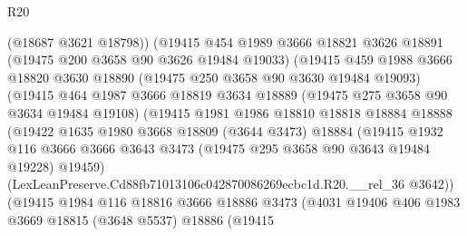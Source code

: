 \begin{lexlean}{R20}
\begin{coremodule}
                        (@18687 @3621 @18798))
                      (@19415
                        @454
                        @1989
                        @3666
                        @18821
                        @3626
                        @18891
                        (@19475 @200 @3658 @90 @3626 @19484 @19033)
                        (@19415
                          @459
                          @1988
                          @3666
                          @18820
                          @3630
                          @18890
                          (@19475 @250 @3658 @90 @3630 @19484 @19093)
                          (@19415
                            @464
                            @1987
                            @3666
                            @18819
                            @3634
                            @18889
                            (@19475 @275 @3658 @90 @3634 @19484 @19108)
                            (@19415
                              @1981
                              @1986
                              @18810
                              @18818
                              @18884
                              @18888
                              (@19422
                                @1635
                                @1980
                                @3668
                                @18809
                                (@3644 @3473)
                                @18884
                                (@19415
                                  @1932
                                  @116
                                  @3666
                                  @3666
                                  @3643
                                  @3473
                                  (@19475 @295 @3658 @90 @3643 @19484 @19228)
                                  @19459)
                                (LexLeanPreserve.Cd88fb71013106c042870086269ecbc1d.R20.__rel_36
                                  @3642))
                              (@19415
                                @1984
                                @116
                                @18816
                                @3666
                                @18886
                                @3473
                                (@4031
                                  @19406
                                  @406
                                  @1983
                                  @3669
                                  @18815
                                  (@3648 @5537)
                                  @18886
                                  (@19415

\end{coremodule}
\end{lexlean}
